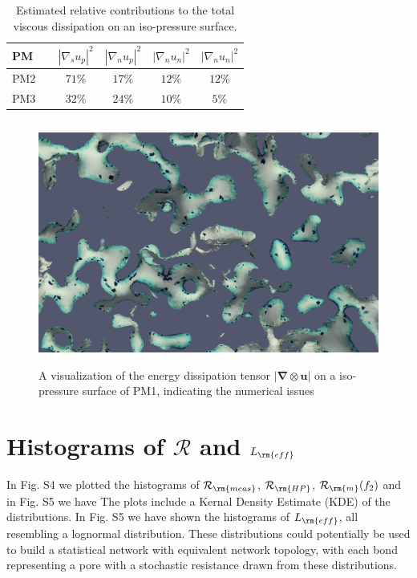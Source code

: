 \documentclass[draft,jgrga]{agutexSI2019}
\begin{document}
\begin{table}[htbp!]\label{tab:sm1}
\centering
\begin{tabular}{l|c|c|c|c|c}
PM & & $\left|\nabla_s u_p\right|^2$ & $ \left|\nabla_n u_p\right|^2$ & $\left|\nabla_n u_n\right|^2$ & $\left|\nabla_n u_n\right|^2$ \\
\hline
PM2 &  & $71 \%$ & $17\%$ & $12\%$ & $12\%$ \\
PM3 &  & $32 \%$ & $24\%$ & $10\%$ & $5\%$ \\
\end{tabular}
\caption{\label{tab:table-name}Estimated relative contributions to the total viscous dissipation on an iso-pressure surface. }
\end{table}




\begin{figure}
\noindent\includegraphics[height=8cm]{figures/nummeric_noise.png}
\caption{A visualization of the energy dissipation tensor $|\mathbf{\nabla}\otimes \mathbf{u}|$ on a iso-pressure surface of PM1, indicating the numerical issues}
\label{fig:numerical noise}
\end{figure}



\section{Histograms of $\mathcal{R}$ and $L_{\rm{eff}}$}

In Fig. S4 we plotted the histograms of  $\mathcal{R}_{\rm{meas}}$, $\mathcal{R}_{\rm{HP}}$, $\mathcal{R}_{\rm{m}}(f_2)$ and in Fig. S5 we have
The plots include a Kernal Density Estimate (KDE) of the distributions. In Fig. S5 we have shown the histograms of $L_{\rm{eff}}$, all resembling a lognormal distribution. These distributions could potentially be used to build a statistical network with equivalent network topology, with each bond representing a pore with a stochastic resistance drawn from these distributions. 
\end{document}

